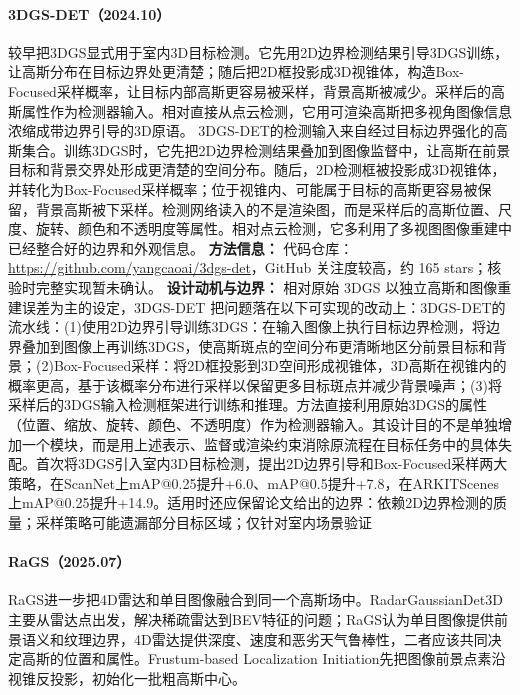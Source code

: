 \paragraph{3DGS-DET（2024.10）\cite{2410_01647}}
较早把3DGS显式用于室内3D目标检测。它先用2D边界检测结果引导3DGS训练，让高斯分布在目标边界处更清楚；随后把2D框投影成3D视锥体，构造Box-Focused采样概率，让目标内部高斯更容易被采样，背景高斯被减少。采样后的高斯属性作为检测器输入。相对直接从点云检测，它用可渲染高斯把多视角图像信息浓缩成带边界引导的3D原语。
3DGS-DET的检测输入来自经过目标边界强化的高斯集合。训练3DGS时，它先把2D边界检测结果叠加到图像监督中，让高斯在前景目标和背景交界处形成更清楚的空间分布。随后，2D检测框被投影成3D视锥体，并转化为Box-Focused采样概率；位于视锥内、可能属于目标的高斯更容易被保留，背景高斯被下采样。检测网络读入的不是渲染图，而是采样后的高斯位置、尺度、旋转、颜色和不透明度等属性。相对点云检测，它多利用了多视图图像重建中已经整合好的边界和外观信息。
\textbf{方法信息：} 代码仓库：\url{https://github.com/yangcaoai/3dgs-det}，GitHub 关注度较高，约 165 stars；核验时完整实现暂未确认。
\textbf{设计动机与边界：} 相对原始 3DGS 以独立高斯和图像重建误差为主的设定，3DGS-DET 把问题落在以下可实现的改动上：3DGS-DET的流水线：(1)使用2D边界引导训练3DGS：在输入图像上执行目标边界检测，将边界叠加到图像上再训练3DGS，使高斯斑点的空间分布更清晰地区分前景目标和背景；(2)Box-Focused采样：将2D框投影到3D空间形成视锥体，3D高斯在视锥内的概率更高，基于该概率分布进行采样以保留更多目标斑点并减少背景噪声；(3)将采样后的3DGS输入检测框架进行训练和推理。方法直接利用原始3DGS的属性（位置、缩放、旋转、颜色、不透明度）作为检测器输入。其设计目的不是单独增加一个模块，而是用上述表示、监督或渲染约束消除原流程在目标任务中的具体失配。首次将3DGS引入室内3D目标检测，提出2D边界引导和Box-Focused采样两大策略，在ScanNet上mAP@0.25提升+6.0、mAP@0.5提升+7.8，在ARKITScenes上mAP@0.25提升+14.9。适用时还应保留论文给出的边界：依赖2D边界检测的质量；采样策略可能遗漏部分目标区域；仅针对室内场景验证
\paragraph{RaGS（2025.07）\cite{2507_19856}}
RaGS进一步把4D雷达和单目图像融合到同一个高斯场中。RadarGaussianDet3D主要从雷达点出发，解决稀疏雷达到BEV特征的问题；RaGS认为单目图像提供前景语义和纹理边界，4D雷达提供深度、速度和恶劣天气鲁棒性，二者应该共同决定高斯的位置和属性。Frustum-based Localization Initiation先把图像前景点素沿视锥反投影，初始化一批粗高斯中心。

